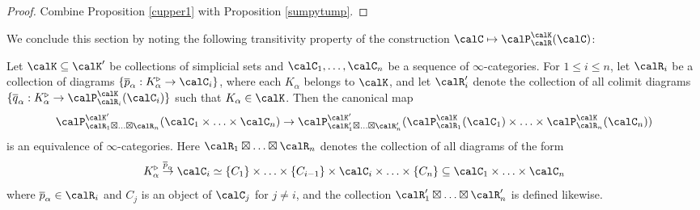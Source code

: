 \begin{proof}
Combine Proposition \ref{cupper1} with Proposition \ref{sumpytump}.
\end{proof}

We conclude this section by noting the following transitivity property of the construction
$\calC \mapsto \calP^{\calK}_{\calR}(\calC)$:

\begin{proposition}\label{transit1}
Let $\calK \subseteq \calK'$ be collections of simplicial sets and 
$\calC_1, \ldots, \calC_n$ be a sequence of $\infty$-categories. For
$1 \leq i \leq n$, let $\calR_i$ be a collection of diagrams $\{ \overline{p}_{\alpha}: K^{\triangleright}_{\alpha} \rightarrow \calC_i \}$, where each $K_{\alpha}$ belongs to $\calK$, and let
$\calR'_i$ denote the collection of all colimit diagrams $\{ \overline{q}_{\alpha}: K^{\triangleright}_{\alpha} \rightarrow \calP^{\calK}_{\calR_i}( \calC_i)  \}$ such that $K_{\alpha} \in \calK$.
Then the canonical map
$$ \calP^{\calK'}_{ \calR_1 \boxtimes \ldots \boxtimes \calR_n}( \calC_1 \times \ldots \times \calC_n)
\rightarrow \calP^{\calK'}_{ \calR'_1 \boxtimes \ldots \boxtimes \calR'_{n} }( \calP^{\calK}_{\calR_1}( \calC_1) \times \ldots \times \calP^{\calK}_{ \calR_n}(\calC_n) )$$
is an equivalence of $\infty$-categories. Here $\calR_1 \boxtimes \ldots \boxtimes \calR_n$ denotes
the collection of all diagrams of the form
$$ K_{\alpha}^{\triangleright} \stackrel{ \overline{p}_{\alpha}}{\rightarrow}
\calC_i \simeq \{ C_1 \} \times \ldots \times \{C_{i-1} \} \times \calC_i \times \ldots \times \{ C_n \}
\subseteq \calC_1 \times \ldots \times \calC_n$$
where $\overline{p}_{\alpha} \in \calR_i$ and $C_{j}$ is an object of $\calC_j$ for $j \neq i$, and
the collection $\calR'_1 \boxtimes \ldots \boxtimes \calR'_{n}$ is defined likewise.
\end{proposition}

